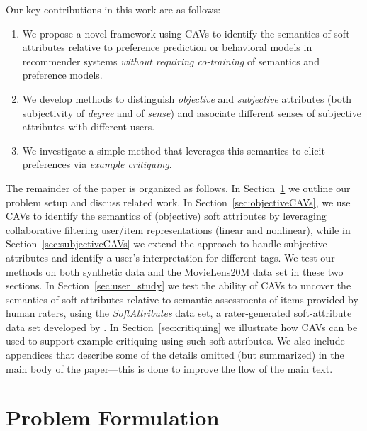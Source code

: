\documentclass[manuscript,screen,nonacm]{acmart}
\newcommand{\1}{{\mathbf 1}}
\theoremstyle{TheoremNum}
\begin{document}
Our key contributions in this work are as follows:
\begin{enumerate}[(1)]
\item We propose a novel framework using CAVs to identify the semantics of soft attributes relative to preference prediction or behavioral models in recommender systems \emph{without requiring co-training} of semantics and preference models.
\item We develop methods to distinguish \emph{objective} and \emph{subjective} attributes (both subjectivity of
\emph{degree} and of \emph{sense}) and associate different senses of subjective attributes with different users.
\item We investigate a simple method that leverages this semantics to elicit preferences via \emph{example critiquing}.
\end{enumerate}

The remainder of the paper is organized as follows. In Section~\ref{sec:formulation} we outline our problem setup and discuss related work. In Section~\ref{sec:objectiveCAVs}, we use CAVs to identify the semantics of (objective) soft attributes by leveraging collaborative filtering user/item representations (linear and nonlinear), while in Section~\ref{sec:subjectiveCAVs} we extend the approach to handle subjective attributes and identify a user's interpretation for different tags.  We test our methods on both synthetic data and the MovieLens20M data set \cite{harper16:movielens} in these two sections. In
Section~\ref{sec:user_study} we test the ability of CAVs to uncover the semantics of soft attributes relative to semantic assessments of items provided by human raters, using the \emph{SoftAttributes} data set, a rater-generated soft-attribute data set developed by \citet{sigir21:filipandkristian}. In Section~\ref{sec:critiquing} we illustrate how CAVs can be used to support example critiquing using such soft attributes. We also include appendices that describe some of the details omitted (but summarized) in the main body of the paper---this is done to improve the flow of the main text.

\section{Problem Formulation}
\label{sec:formulation}
\end{document}
